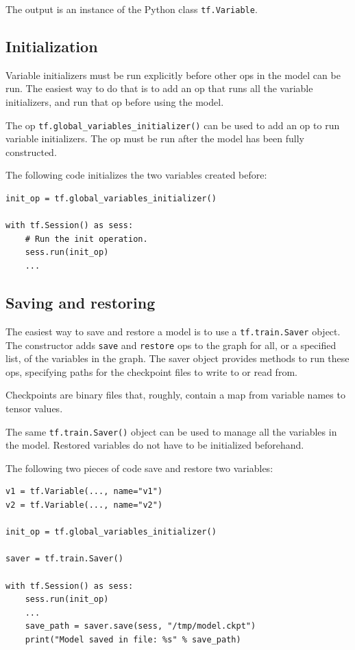 The output is an instance of the Python class \lstinline|tf.Variable|.

\subsection{Initialization}

Variable initializers must be run explicitly before other ops in the model can be run. The easiest way to do that is to add an op that runs all the variable initializers, and run that op before using the model.

The op \lstinline|tf.global_variables_initializer()| can be used to add an op to run variable initializers. The op must be run after the model has been fully constructed.

The following code initializes the two variables created before:

\begin{lstlisting}
init_op = tf.global_variables_initializer()

with tf.Session() as sess:
    # Run the init operation.
    sess.run(init_op)
    ...
\end{lstlisting}

\subsection{Saving and restoring}

The easiest way to save and restore a model is to use a \lstinline|tf.train.Saver| object. The constructor adds \lstinline|save| and \lstinline|restore| ops to the graph for all, or a specified list, of the variables in the graph. The saver object provides methods to run these ops, specifying paths for the checkpoint files to write to or read from.

Checkpoints are binary files that, roughly, contain a map from variable names to tensor values.

The same \lstinline|tf.train.Saver()| object can be used to manage all the variables in the model. Restored variables do not have to be initialized beforehand.

The following two pieces of code save and restore two variables:

\begin{lstlisting}
v1 = tf.Variable(..., name="v1")
v2 = tf.Variable(..., name="v2")

init_op = tf.global_variables_initializer()

saver = tf.train.Saver()

with tf.Session() as sess:
    sess.run(init_op)
    ...
    save_path = saver.save(sess, "/tmp/model.ckpt")
    print("Model saved in file: %s" % save_path)
\end{lstlisting}

